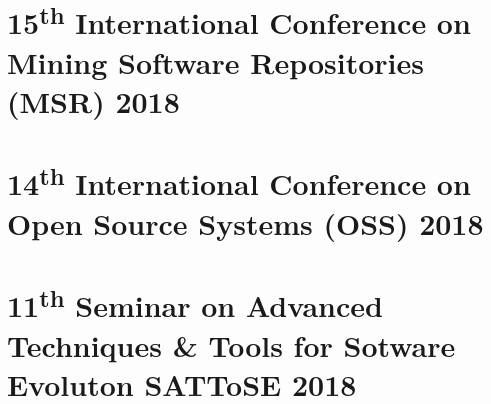 \documentclass[a4paper, 12pt]{book}
\begin{document}
\newpage
\section{15\textsuperscript{th} International Conference on Mining Software Repositories (MSR) 2018}
\label{MSR}



\section{14\textsuperscript{th} International Conference on Open Source Systems (OSS) 2018}
\label{OSS}



\section{11\textsuperscript{th} Seminar on Advanced Techniques \& Tools for Sotware Evoluton SATToSE 2018}
\label{SATToSE}

\end{document}
